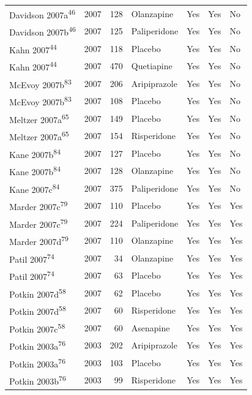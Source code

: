 \documentclass[
  9pt,
  english,
  ,jou,floatsintext]{apa6}
\begin{document}
\begin{longtable}[]{@{}lrrllll@{}}
Davidson 2007a\textsuperscript{46} & 2007 & 128 & Olanzapine & Yes & Yes & No \\
Davidson 2007b\textsuperscript{46} & 2007 & 125 & Paliperidone & Yes & Yes & No \\
Kahn 2007\textsuperscript{44} & 2007 & 118 & Placebo & Yes & Yes & No \\
Kahn 2007\textsuperscript{44} & 2007 & 470 & Quetiapine & Yes & Yes & No \\
McEvoy 2007b\textsuperscript{83} & 2007 & 206 & Aripiprazole & Yes & Yes & No \\
McEvoy 2007b\textsuperscript{83} & 2007 & 108 & Placebo & Yes & Yes & No \\
Meltzer 2007a\textsuperscript{65} & 2007 & 149 & Placebo & Yes & Yes & No \\
Meltzer 2007a\textsuperscript{65} & 2007 & 154 & Risperidone & Yes & Yes & No \\
Kane 2007b\textsuperscript{84} & 2007 & 127 & Placebo & Yes & Yes & No \\
Kane 2007b\textsuperscript{84} & 2007 & 128 & Olanzapine & Yes & Yes & No \\
Kane 2007c\textsuperscript{84} & 2007 & 375 & Paliperidone & Yes & Yes & No \\
Marder 2007c\textsuperscript{79} & 2007 & 110 & Placebo & Yes & Yes & Yes \\
Marder 2007c\textsuperscript{79} & 2007 & 224 & Paliperidone & Yes & Yes & Yes \\
Marder 2007d\textsuperscript{79} & 2007 & 110 & Olanzapine & Yes & Yes & Yes \\
Patil 2007\textsuperscript{74} & 2007 & 34 & Olanzapine & Yes & Yes & Yes \\
Patil 2007\textsuperscript{74} & 2007 & 63 & Placebo & Yes & Yes & Yes \\
Potkin 2007d\textsuperscript{58} & 2007 & 62 & Placebo & Yes & Yes & Yes \\
Potkin 2007d\textsuperscript{58} & 2007 & 60 & Risperidone & Yes & Yes & Yes \\
Potkin 2007c\textsuperscript{58} & 2007 & 60 & Asenapine & Yes & Yes & Yes \\
Potkin 2003a\textsuperscript{76} & 2003 & 202 & Aripiprazole & Yes & Yes & Yes \\
Potkin 2003a\textsuperscript{76} & 2003 & 103 & Placebo & Yes & Yes & Yes \\
Potkin 2003b\textsuperscript{76} & 2003 & 99 & Risperidone & Yes & Yes & Yes \\

\end{longtable}
\end{document}
